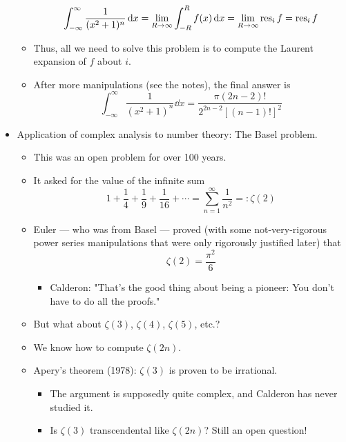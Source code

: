 \documentclass[../notes.tex]{subfiles}
\begin{document}
\begin{itemize}
\begin{itemize}
\begin{equation*}
            \int_{-\infty}^\infty\frac{1}{(x^2+1)^n}\dd{x} = \lim_{R\to\infty}\int_{-R}^Rf(x)\dd{x}
            = \lim_{R\to\infty}\operatorname{res}_if
            = \operatorname{res}_if
        \end{equation*}
        \item Thus, all we need to solve this problem is to compute the Laurent expansion of $f$ about $i$.
        \item After more manipulations (see the notes), the final answer is
        \begin{equation*}
            \int_{-\infty}^\infty\frac{1}{(x^2+1)^n}\dd{x} = \frac{\pi(2n-2)!}{2^{2n-2}[(n-1)!]^2}
        \end{equation*}
    \end{itemize}
    \item Application of complex analysis to number theory: The Basel problem.
    \begin{itemize}
        \item This was an open problem for over 100 years.
        \item It asked for the value of the infinite sum
        \begin{equation*}
            1+\frac{1}{4}+\frac{1}{9}+\frac{1}{16}+\cdots = \sum_{n=1}^\infty\frac{1}{n^2} =: \zeta(2)
        \end{equation*}
        \item Euler --- who was from Basel --- proved (with some not-very-rigorous power series manipulations that were only rigorously justified later) that
        \begin{equation*}
            \zeta(2) = \frac{\pi^2}{6}
        \end{equation*}
        \begin{itemize}
            \item Calderon: "That's the good thing about being a pioneer: You don't have to do all the proofs."
        \end{itemize}
        \item But what about $\zeta(3)$, $\zeta(4)$, $\zeta(5)$, etc.?
        \item We know how to compute $\zeta(2n)$.
        \item Apery's theorem (1978): $\zeta(3)$ is proven to be irrational.
        \begin{itemize}
            \item The argument is supposedly quite complex, and Calderon has never studied it.
            \item Is $\zeta(3)$ transcendental like $\zeta(2n)$? Still an open question!

\end{itemize}
\end{itemize}
\end{itemize}
\end{document}
